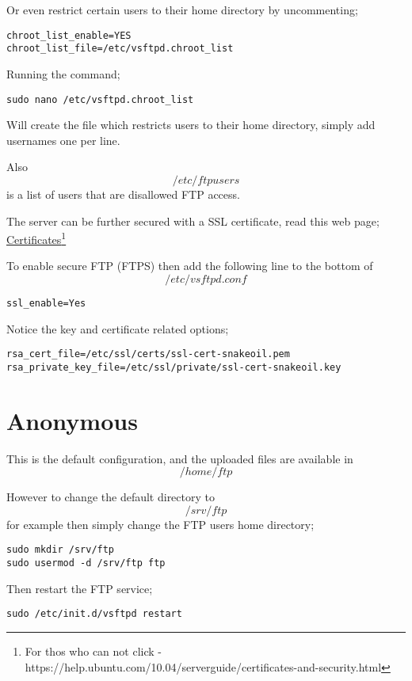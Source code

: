 Or even restrict certain users to their home directory by uncommenting;

\begin{lstlisting}
chroot_list_enable=YES
chroot_list_file=/etc/vsftpd.chroot_list
\end{lstlisting}

Running the command;

\begin{lstlisting}
sudo nano /etc/vsftpd.chroot_list
\end{lstlisting}

Will create the file which restricts users to their home directory, simply add usernames one per line.

Also $$ /etc/ftpusers $$ is a list of users that are disallowed FTP access.

The server can be further secured with a SSL certificate, read this web page; \href{https://help.ubuntu.com/10.04/serverguide/certificates-and-security.html}{Certificates}\footnote{For thos who can not click - https://help.ubuntu.com/10.04/serverguide/certificates-and-security.html}

To enable secure FTP (FTPS) then add the following line to the bottom of $$/etc/vsftpd.conf$$

\begin{lstlisting}
ssl_enable=Yes
\end{lstlisting}

Notice the key and certificate related options;

\begin{lstlisting}
rsa_cert_file=/etc/ssl/certs/ssl-cert-snakeoil.pem
rsa_private_key_file=/etc/ssl/private/ssl-cert-snakeoil.key
\end{lstlisting}

\section{Anonymous}

This is the default configuration, and the uploaded files are available in 
$$
/home/ftp
$$

However to change the default directory to $$/srv/ftp$$ for example then simply change the FTP users home directory;

\begin{lstlisting}
sudo mkdir /srv/ftp
sudo usermod -d /srv/ftp ftp 
\end{lstlisting}

Then restart the FTP service;

\begin{lstlisting}
sudo /etc/init.d/vsftpd restart
\end{lstlisting}